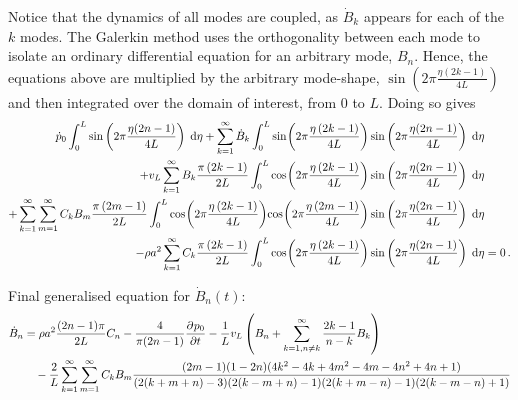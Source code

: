 Notice that the dynamics of all modes are coupled, as $\dot{B}_k$ appears for each of the $k$ modes. The Galerkin method uses the orthogonality between each mode to isolate an ordinary differential equation for an arbitrary mode, $B_n$. Hence, the equations above are multiplied by the arbitrary mode-shape, $\sin\left(2\pi\frac{\eta(2k-1)}{4L}\right)$ and then integrated over the domain of interest, from $0$ to $L$. Doing so gives
~
\begin{equation*}
\begin{split}
    \dot{p}_0 \int^L_0 \sin\left(2\pi\frac{\eta(2n-1)}{4L}\right) \Idx{\eta}
    + \sum_{k=1}^{\infty} \dot{B}_k \int^L_0 \fun{sin}{2\pi \frac{\eta \left( 2 k - 1 \right)}{4L}} \sin\left(2\pi\frac{\eta(2n-1)}{4L}\right) \Idx{\eta}
    & \\ %
    + v_L \sum_{k=1}^{\infty} B_k \frac{\pi \left( 2 k - 1 \right)}{2L} \int^L_0 \fun{cos}{2\pi \frac{\eta \left( 2 k - 1 \right)}{4L}} \sin\left(2\pi\frac{\eta(2n-1)}{4L}\right) \Idx{\eta}
    & \\ %
    + \sum_{k=1}^{\infty} \sum_{m=1}^{\infty} C_k B_m \frac{\pi \left( 2 m - 1 \right)}{2L} \int^L_0 \fun{cos}{2\pi \frac{\eta \left( 2 k - 1 \right)}{4L}} \fun{cos}{2\pi \frac{\eta \left( 2 m - 1 \right)}{4L}} \sin\left(2\pi\frac{\eta(2n-1)}{4L}\right) \Idx{\eta}
    & \\ %
    - \rho a^2 \sum_{k=1}^{\infty} C_k \frac{\pi \left( 2 k - 1 \right)}{2L} \int^L_0 \fun{cos}{2\pi \frac{\eta \left( 2 k - 1 \right)}{4L}} \sin\left(2\pi\frac{\eta(2n-1)}{4L}\right) \Idx{\eta}
    &= 0 \, .
\end{split}
\end{equation*}

Final generalised equation for $\dot{B}_n(t)$:
~
\begin{equation*}
\begin{split}
    \dot{B}_n &=
    \rho a^2 \frac{(2n-1)\pi}{2L} C_n
    - \frac{4}{\pi(2n-1)} \pdiff{p_0}{t}
    - \frac{1}{L} v_L \left( B_n + \sum^{\infty}_{k = 1,n \neq k} \frac{2k-1}{n-k} B_k \right)
    \\ & \quad
    - \frac{2}{L} \sum^{\infty}_{k=1} \sum^{\infty}_{m=1} C_k B_m \frac{
    (2m-1)(1-2n)(4k^2 - 4k + 4m^2 - 4m - 4n^2 + 4n + 1)
    }{
    (2(k+m+n)-3)(2(k-m+n)-1)(2(k+m-n)-1)(2(k-m-n)+1)
    }
\end{split}
\end{equation*}

